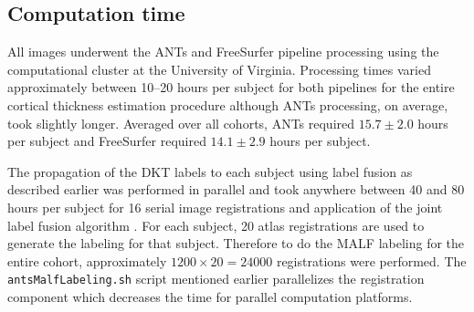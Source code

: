    

\subsection{Computation time}


All images underwent the ANTs and FreeSurfer pipeline processing 
using the computational cluster at the University of Virginia.  
Processing times varied approximately between 10--20 hours per subject
for both pipelines for the entire cortical thickness estimation procedure
although ANTs processing, on average, took slightly longer.  Averaged over all cohorts, ANTs required 
$15.7 \pm 2.0 $ hours per subject and FreeSurfer required $14.1 \pm 2.9$ hours per subject.

The propagation of the DKT labels to each subject using label fusion as described earlier
was performed in parallel and took anywhere between 40 and 80 hours per 
subject for 16 serial image registrations and application of the joint label fusion algorithm \citep{wang2013}. 
For each subject, 20 atlas registrations are used to generate the labeling 
for that subject.  Therefore to do the MALF labeling for the entire cohort, approximately 
$1200 \times 20 = 24000$ registrations were performed.  
The {\tt antsMalfLabeling.sh} script mentioned earlier parallelizes
the registration component which decreases the time for parallel computation platforms.
 
 
 

